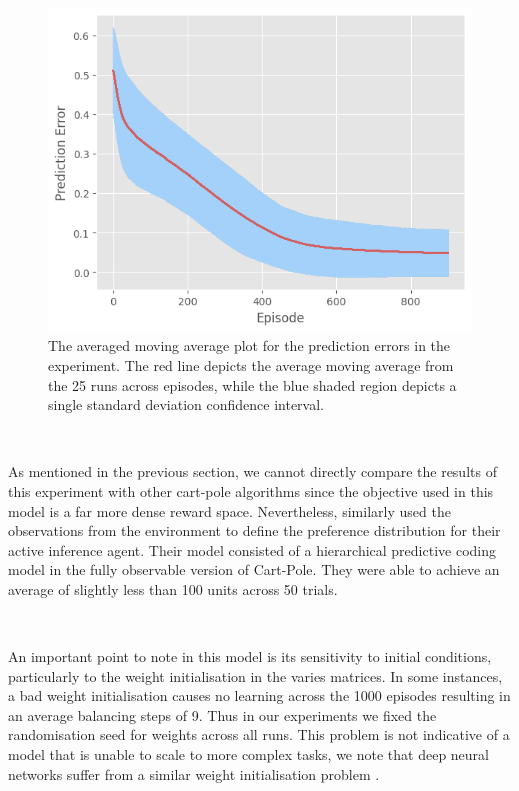 \documentclass{article}
\begin{document}
\begin{figure}[htbp]
    \centering
        \begin{minipage}[c]{0.6\textwidth}
        \includegraphics[width=\textwidth]{images/pred_error.png}
    \end{minipage}
    \hfill
    \begin{minipage}[c]{0.35\textwidth}
        \caption{The averaged moving average plot for the prediction errors in the experiment. The red line depicts the average moving average from the 25 runs across episodes, while the blue shaded region depicts a single standard deviation confidence interval.}
        \label{fig:tpc_pred_error}
    \end{minipage}
\end{figure}

\

As mentioned in the previous section, we cannot directly compare the results of this experiment with other cart-pole algorithms since the objective used in this model is a far more dense reward space. Nevertheless, \citet{millidge2024temporal} similarly used the observations from the environment to define the preference distribution for their active inference agent. Their model consisted of a hierarchical predictive coding model in the fully observable version of Cart-Pole. They were able to achieve an average of slightly less than 100 units across 50 trials.


\

An important point to note in this model is its sensitivity to initial conditions, particularly to the weight initialisation in the varies matrices. In some instances, a bad weight initialisation causes no learning across the 1000 episodes resulting in an average balancing steps of 9. Thus in our experiments we fixed the randomisation seed for weights across all runs. This problem is not indicative of a model that is unable to scale to more complex tasks, we note that deep neural networks suffer from a similar weight initialisation problem \citep{mishkin2016needgoodinit}. 
\end{document}
